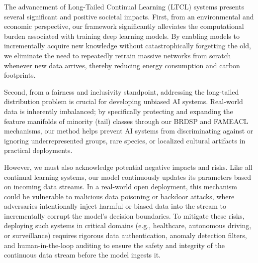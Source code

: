 \documentclass[journal]{IEEEtran}
\theoremstyle{plain}
\theoremstyle{definition}
\theoremstyle{remark}
\begin{document}
The advancement of Long-Tailed Continual Learning (LTCL) systems presents several significant and positive societal impacts. First, from an environmental and economic perspective, our framework significantly alleviates the computational burden associated with training deep learning models. By enabling models to incrementally acquire new knowledge without catastrophically forgetting the old, we eliminate the need to repeatedly retrain massive networks from scratch whenever new data arrives, thereby reducing energy consumption and carbon footprints. 

Second, from a fairness and inclusivity standpoint, addressing the long-tailed distribution problem is crucial for developing unbiased AI systems. Real-world data is inherently imbalanced; by specifically protecting and expanding the feature manifolds of minority (tail) classes through our BRDSP and FAMEACL mechanisms, our method helps prevent AI systems from discriminating against or ignoring underrepresented groups, rare species, or localized cultural artifacts in practical deployments.

However, we must also acknowledge potential negative impacts and risks. Like all continual learning systems, our model continuously updates its parameters based on incoming data streams. In a real-world open deployment, this mechanism could be vulnerable to malicious data poisoning or backdoor attacks, where adversaries intentionally inject harmful or biased data into the stream to incrementally corrupt the model's decision boundaries. To mitigate these risks, deploying such systems in critical domains (e.g., healthcare, autonomous driving, or surveillance) requires rigorous data authentication, anomaly detection filters, and human-in-the-loop auditing to ensure the safety and integrity of the continuous data stream before the model ingests it.
\newpage
\end{document}
